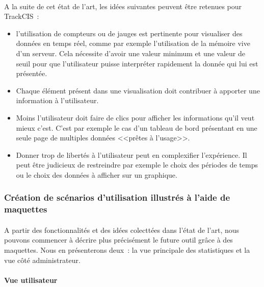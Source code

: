 			\paragraph{}
			A la suite de cet état de l'art, les idées suivantes peuvent être retenues
			pour TrackCIS~:
			\begin{itemize}
			  \item l'utilisation de compteurs ou de jauges est pertinente pour
			  visualiser des données en temps réel, comme par exemple l'utilisation de
			  la mémoire vive d'un serveur. Cela nécessite d'avoir une valeur minimum et
			  une valeur de seuil pour que l'utilisateur puisse interpréter rapidement la
			  donnée qui lui est présentée.
			  \item Chaque élément présent dans une visualisation doit contribuer à
			  apporter une information à l'utilisateur.
			  \item Moins l'utilisateur doit faire de clics pour afficher les
			  informations qu'il veut mieux c'est. C'est par exemple le cas d'un tableau
			  de bord présentant en une seule page de multiples données <<prêtes à
			  l'usage>>.
			  \item Donner trop de libertés à l'utilisateur peut en complexifier
			  l'expérience. Il peut être judicieux de restreindre par exemple le choix
			  des périodes de temps ou le choix des données à afficher sur un graphique.
			\end{itemize}
			
		\subsubsection{Création de scénarios d'utilisation illustrés à l'aide de
		maquettes}
			\paragraph{}
			A partir des fonctionnalités et des idées colecttées dans l'état de l'art,
			nous pouvons commencer à décrire plus précisément le future outil grâce à des
			maquettes. Nous en présenterons deux~: la vue principale des statistiques et
			la vue côté administrateur.
			
			\paragraph{Vue utilisateur}
			
